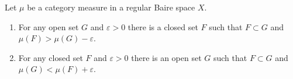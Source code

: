 Let $\mu$ be a category measure in a regular Baire space $X$.

\begin{enumerate}
\item For any open set $G$ and $\varepsilon > 0$ there is a closed set $F$ such that $F \subset G$ and $\mu(F) > \mu(G) - \varepsilon$.
\item For any closed set $F$ and $\varepsilon > 0$ there is an open set $G$ such that $F \subset G$ and $\mu(G) < \mu(F) + \varepsilon$.
\end{enumerate}
